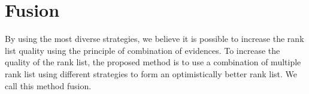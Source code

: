 \section{Fusion \label{sec:fusion}}

By using the most diverse strategies, we believe it is possible to increase the rank list quality using the principle of combination of evidences.
To increase the quality of the rank list, the proposed method is to use a combination of multiple rank list using different strategies to form an optimistically better rank list.
We call this method fusion.



